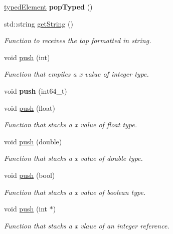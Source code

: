 \begin{DoxyCompactItemize}
\mbox{\label{classPilhaOperandos_a9dd3f7998df13b3bef6f13a1edecf3a4}} 
\hyperlink{structtypedElement__s}{typed\+Element} {\bfseries pop\+Typed} ()
\item 
\mbox{\label{classPilhaOperandos_a26d2bb2bcaf156c09ed688958a6f00e2}} 
std\+::string \hyperlink{classPilhaOperandos_a26d2bb2bcaf156c09ed688958a6f00e2}{get\+String} ()
\begin{DoxyCompactList}\small\item\em Function to receives the top formatted in string. \end{DoxyCompactList}\item 
void \hyperlink{classPilhaOperandos_aebcb6ec63863f3f273f2ded4331de26a}{push} (int)
\begin{DoxyCompactList}\small\item\em Function that empiles a x value of integer type. \end{DoxyCompactList}\item 
\mbox{\label{classPilhaOperandos_a6f8e84e9eeaac29d5607d0e87d7a566a}} 
void {\bfseries push} (int64\+\_\+t)
\item 
void \hyperlink{classPilhaOperandos_ab696a021a389db273c043bedf1e5f4d6}{push} (float)
\begin{DoxyCompactList}\small\item\em Function that stacks a x value of float type. \end{DoxyCompactList}\item 
void \hyperlink{classPilhaOperandos_a4b55bb7ee498ded849f19702e602fe85}{push} (double)
\begin{DoxyCompactList}\small\item\em Function that stacks a x value of double type. \end{DoxyCompactList}\item 
void \hyperlink{classPilhaOperandos_a76e6e4b9d47f9e549e4a9d76aef6d89d}{push} (bool)
\begin{DoxyCompactList}\small\item\em Function that stacks a x value of boolean type. \end{DoxyCompactList}\item 
void \hyperlink{classPilhaOperandos_aef0bd19eae8107546d419aba6d7c2d47}{push} (int $\ast$)
\begin{DoxyCompactList}\small\item\em Function that stacks a x vlaue of an integer reference. \end{DoxyCompactList}\item 

\end{DoxyCompactItemize}
